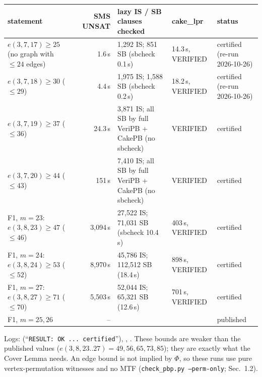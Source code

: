 \begin{center}\footnotesize
\begin{tabular}{@{}p{3.8cm} r p{3.7cm} p{1.9cm} p{2.3cm}@{}}
\toprule
statement & SMS UNSAT & lazy IS / SB clauses checked & cake\_lpr & status \\
\midrule
$e(3,7,17) \ge 25$ (no graph with $\le 24$ edges) & 1.6\,s & 1,292 IS; 851 SB (sbcheck 0.1\,s) & 14.3\,s, VERIFIED & certified (re-run 2026-10-26) \\
$e(3,7,18) \ge 30$ ($\le 29$) & 4.4\,s & 1,975 IS; 1,588 SB (sbcheck 0.2\,s) & 18.2\,s, VERIFIED & certified (re-run 2026-10-26) \\
$e(3,7,19) \ge 37$ ($\le 36$) & 24.3\,s & 3,871 IS; all SB by full VeriPB + CakePB (no sbcheck) & VERIFIED & certified \\
$e(3,7,20) \ge 44$ ($\le 43$) & 151\,s & 7,410 IS; all SB by full VeriPB + CakePB (no sbcheck) & VERIFIED & certified \\
F1, $m = 23$: $e(3,8,23) \ge 47$ ($\le 46$) & 3,094\,s & 27,522 IS; 71,031 SB (sbcheck 10.4\,s) & 403\,s, VERIFIED & certified \\
F1, $m = 24$: $e(3,8,24) \ge 53$ ($\le 52$) & 8,970\,s & 45,786 IS; 112,512 SB (18.4\,s) & 898\,s, VERIFIED & certified \\
F1, $m = 27$: $e(3,8,27) \ge 71$ ($\le 70$) & 5,503\,s & 52,044 IS; 65,321 SB (12.6\,s) & 701\,s, VERIFIED & certified \\
F1, $m = 25, 26$ & -- & & & published \cite{GR} \\
\bottomrule
\end{tabular}
\end{center}

Logs:  (``\texttt{RESULT: OK ... certified}''), , .
These bounds are weaker than the published values ($e(3,8,23..27) = 49, 56, 65, 73, 85$); they are exactly
what the Cover Lemma needs. An edge bound is not implied by $\Phi$, so these runs use pure vertex-permutation
witnesses and no MTF (\texttt{check\_pbp.py --perm-only};  Sec.~1.2).

